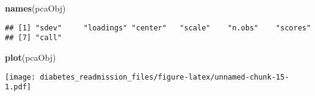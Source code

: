 \documentclass[]{article}
\newenvironment{Shaded}{\begin{snugshade}}{\end{snugshade}}
\newcommand{\KeywordTok}[1]{\textcolor[rgb]{0.13,0.29,0.53}{\textbf{#1}}}
\newcommand{\OperatorTok}[1]{\textcolor[rgb]{0.81,0.36,0.00}{\textbf{#1}}}
\newcommand{\NormalTok}[1]{#1}
\begin{document}
\begin{Shaded}
\begin{Highlighting}[]
\KeywordTok{names}\NormalTok{(pcaObj)}
\end{Highlighting}
\end{Shaded}

\begin{verbatim}
## [1] "sdev"     "loadings" "center"   "scale"    "n.obs"    "scores"  
## [7] "call"
\end{verbatim}

\begin{Shaded}
\begin{Highlighting}[]
\KeywordTok{plot}\NormalTok{(pcaObj)}
\end{Highlighting}
\end{Shaded}

\texttt{[image: diabetes\_readmission\_files/figure-latex/unnamed-chunk-15-1.pdf]}

\begin{Shaded}
\end{Shaded}
\end{document}
